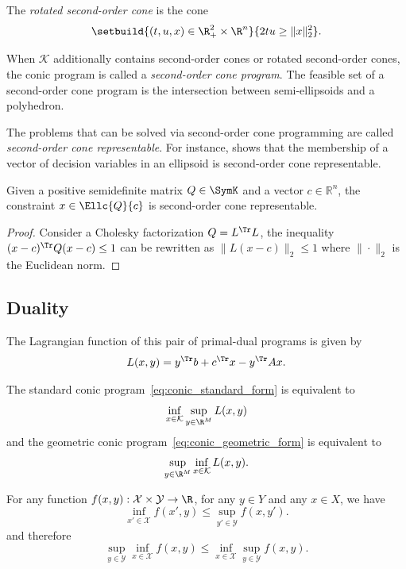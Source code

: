 \documentclass[11pt,twoside,a4paper,openright]{uclouvain-thesis}
\begin{document}
\begin{mydef}
  The \emph{rotated second-order cone} is the cone
  \begin{equation}
    \label{eq:rsoc}
    \setbuild{(t,u,x) \in \R_+^2 \times \R^n}{2tu \ge \lVert x \rVert_2^2}.
  \end{equation}
\end{mydef}

When $\mathcal{K}$ additionally contains second-order cones or rotated second-order cones,
the conic program is called a \emph{second-order cone program}.
The feasible set of a second-order cone program is the intersection between semi-ellipsoids and a polyhedron.

The problems that can be solved via second-order cone programming are
called \emph{second-order cone representable}.
For instance,  shows that the membership of a vector of
decision variables in an ellipsoid is second-order cone representable.
\begin{myprop}
  \label{prop:memsoc}
  Given a positive semidefinite matrix $Q \in \SymK$ and a vector $c \in \mathbb{R}^n$,
  the constraint $x \in \Ellc{Q}{c}$ is second-order cone representable.
  \begin{proof}
    Consider a Cholesky factorization $Q = L^\Tr L$,
    the inequality $(x-c)^\Tr Q (x-c) \leq 1$ can be rewritten as
    $\|L(x-c)\|_2 \leq 1$ where $\|\cdot\|_2$ is the Euclidean norm.
  \end{proof}
\end{myprop}

\subsection{Duality}

The Lagrangian function of this pair of primal-dual programs is given by
\begin{equation}
  \label{eq:Lagrangian}
  L(x, y) = y^\Tr b + c^\Tr x - y^\Tr A x.
\end{equation}

The standard conic program~\eqref{eq:conic_standard_form} is equivalent to
\[ \inf\limits_{x\in\mathcal{K}} \sup\limits_{y \in \R^M} L(x, y) \]
and the geometric conic program~\eqref{eq:conic_geometric_form} is equivalent to
\[ \sup\limits_{y\in\R^M} \inf\limits_{x \in \mathcal{K}} L(x, y). \]

\begin{myprop}
  For any function $f(x, y):\mathcal{X} \times \mathcal{Y} \to \R$,
  for any $y \in Y$ and any $x \in X$, we have
  \begin{equation*}
    \inf\limits_{x' \in \mathcal{X}} f(x', y) \le \sup\limits_{y' \in \mathcal{Y}} f(x, y').
  \end{equation*}
  and therefore
  \begin{equation*}
    \sup\limits_{y\in\mathcal{Y}} \inf\limits_{x \in \mathcal{X}} f(x, y) \le \inf\limits_{x\in\mathcal{X}} \sup\limits_{y \in \mathcal{Y}} f(x, y).
  \end{equation*}
\end{myprop}
\end{document}
